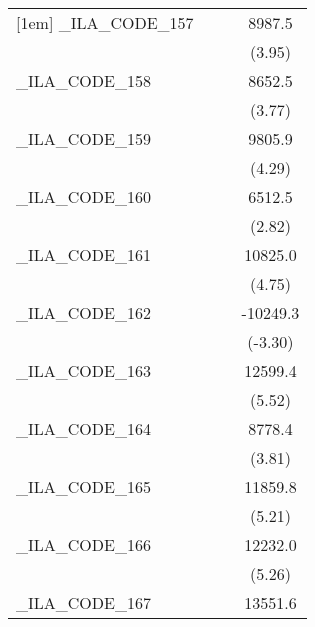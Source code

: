 {\begin{tabular}{l*{3}{c}}
[1em]
\_ILA\_CODE\_157&                     &                     &      8987.5\sym{***}\\
            &                     &                     &      (3.95)         \\
[1em]
\_ILA\_CODE\_158&                     &                     &      8652.5\sym{***}\\
            &                     &                     &      (3.77)         \\
[1em]
\_ILA\_CODE\_159&                     &                     &      9805.9\sym{***}\\
            &                     &                     &      (4.29)         \\
[1em]
\_ILA\_CODE\_160&                     &                     &      6512.5\sym{**} \\
            &                     &                     &      (2.82)         \\
[1em]
\_ILA\_CODE\_161&                     &                     &     10825.0\sym{***}\\
            &                     &                     &      (4.75)         \\
[1em]
\_ILA\_CODE\_162&                     &                     &    -10249.3\sym{***}\\
            &                     &                     &     (-3.30)         \\
[1em]
\_ILA\_CODE\_163&                     &                     &     12599.4\sym{***}\\
            &                     &                     &      (5.52)         \\
[1em]
\_ILA\_CODE\_164&                     &                     &      8778.4\sym{***}\\
            &                     &                     &      (3.81)         \\
[1em]
\_ILA\_CODE\_165&                     &                     &     11859.8\sym{***}\\
            &                     &                     &      (5.21)         \\
[1em]
\_ILA\_CODE\_166&                     &                     &     12232.0\sym{***}\\
            &                     &                     &      (5.26)         \\
[1em]
\_ILA\_CODE\_167&                     &                     &     13551.6\sym{***}\\

\end{tabular}}
